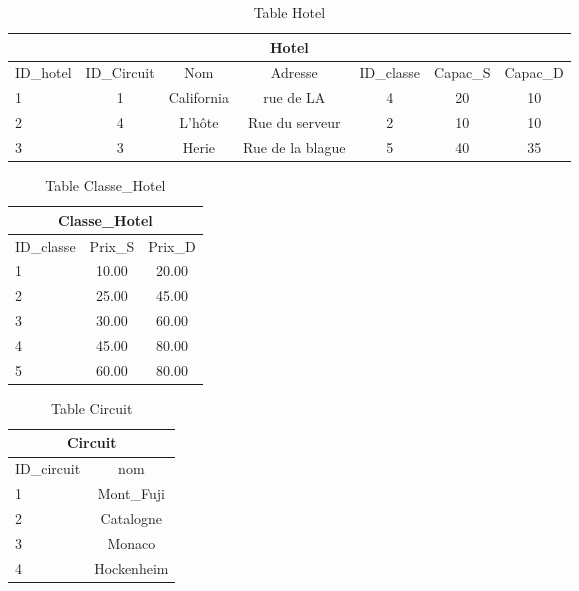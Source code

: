 \begin{table}[h]
\begin{center}
\begin{tabular}{|l|c|c|c|c|c|c|}
\hline
\multicolumn{7}{|c|}{Hotel}\\
\hline
ID\_hotel& ID\_Circuit& Nom & Adresse &ID\_classe & Capac\_S & Capac\_D  \\
\hline
1 & 1& California&rue de LA& 4 & 20 & 10\\
\hline
2 & 4& L'h\^ote&Rue du serveur& 2 & 10 & 10\\
\hline
3 & 3& Herie&Rue de la blague& 5 & 40 & 35\\
\hline
\end{tabular}
\end{center}
\caption{Table Hotel}
\end{table}


\begin{table}[h]
\begin{center}
\begin{tabular}{|l|c|c|}
\hline
\multicolumn{3}{|c|}{Classe\_Hotel}\\
\hline
ID\_classe& Prix\_S & Prix\_D \\
\hline
1 & 10.00& 20.00\\
\hline
2 & 25.00& 45.00\\
\hline
3 & 30.00& 60.00\\
\hline
4 &  45.00& 80.00\\
\hline
5 & 60.00& 80.00\\
\hline
\end{tabular}
\end{center}
\caption{Table Classe\_Hotel}
\end{table}


\begin{table}[h]
\begin{center}
\begin{tabular}{|l|c|}
\hline
\multicolumn{2}{|c|}{Circuit}\\
\hline
ID\_circuit& nom \\
\hline
1 & Mont\_Fuji\\
\hline
2 & Catalogne\\
\hline
3 & Monaco\\
\hline
4 &  Hockenheim\\
\hline
\end{tabular}
\end{center}
\caption{Table Circuit}
\end{table}
\newpage

